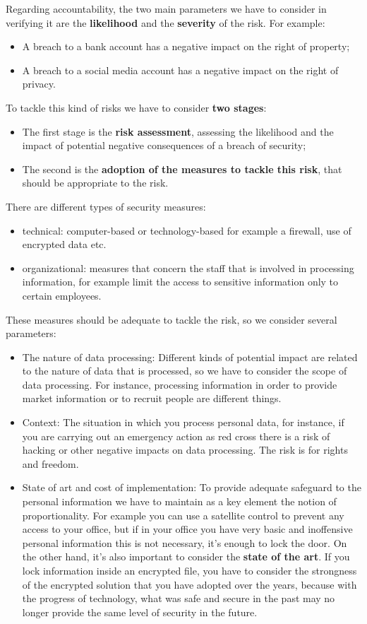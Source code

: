 Regarding accountability, the two main parameters we have to consider in verifying it are the \textbf{likelihood} and the \textbf{severity} of the risk. For example:
\begin{itemize}
    \item A breach to a bank account has a negative impact on the right of property;
    \item A breach to a social media account has a negative impact on the right of privacy.
\end{itemize}
To tackle this kind of risks we have to consider \textbf{two stages}:
\begin{itemize}
    \item The first stage is the \textbf{risk assessment}, assessing the likelihood and the impact of potential negative consequences of a breach of security;
    \item The second is the \textbf{adoption of the measures to tackle this risk}, that should be appropriate to the risk.
\end{itemize}
There are different types of security measures:
\begin{itemize}
    \item technical: computer-based or technology-based for example a  firewall, use of encrypted data etc.
    \item organizational: measures that concern the staff that is involved in processing information, for example limit the access to sensitive information only to certain employees.
\end{itemize}
These measures should be adequate to tackle the risk, so we consider several parameters:
\begin{itemize}
    \item The nature of data processing: Different kinds of potential impact are related to the nature of data that is processed, so we have to consider the scope of data processing. For instance, processing information in order to provide market information or to recruit people are different things.
    \item Context: The situation in which you process personal data, for instance, if you are carrying out an emergency action as red cross there is a risk of hacking or other negative impacts on data processing. The risk is for rights and freedom.
    \item State of art and cost of implementation: To provide adequate safeguard to the personal information we have to maintain as a key element the notion of proportionality. For example you can use a satellite control to prevent any access to your office, but if in your office you have very basic and inoffensive personal information this is not necessary, it's enough to lock the door. On the other hand, it's also important to consider the \textbf{state of the art}. If you lock information inside an encrypted file, you have to consider the strongness of the encrypted solution that you have adopted over the years, because with the progress of technology, what was safe and secure in the past may no longer provide the same level of security in the future.
\end{itemize}
